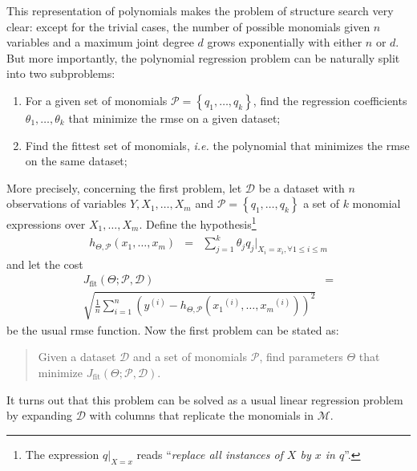 \documentclass[draft,authoryear,3p,times,twocolumn]{elsarticle}
\newcommand{\sample}[1]{\ensuremath{^{\left(#1\right)}}}
\begin{document}
This representation of polynomials makes the problem of structure search very clear: except for the trivial cases, the number of possible monomials given $n$ variables and a maximum joint degree $d$ grows exponentially with either $n$ or $d$. But more importantly, the polynomial regression problem can be naturally split into two subproblems:
%
\begin{enumerate}
\item For a given set of monomials $\mathcal{P} = \left\lbrace q_1, \ldots, q_k\right\rbrace$, find the regression coefficients $\theta_1,\ldots,\theta_k$ that minimize the \ac{rmse} on a given dataset;

\item Find the fittest set of monomials, \emph{i.e.} the polynomial that minimizes the \ac{rmse} on the same dataset;
\end{enumerate}
%
More precisely, concerning the first problem, let $\mathcal{D}$ be a dataset with $n$ observations of variables $Y, X_1,\ldots,X_m$ and $\mathcal{P} = \left\lbrace q_1,\ldots, q_k\right\rbrace$ a set of $k$ monomial expressions over $X_1,\ldots,X_m$. Define the hypothesis\footnote{The expression $q|_{X=x}$ reads ``\emph{replace all instances of $X$ by $x$ in $q$}''.}
%
\begin{eqnarray*}
h_{\Theta,\mathcal{P}}\left(x_1,\ldots,x_m\right) &=& \sum_{j = 1}^k \theta_j q_j|_{X_i=x_i,\forall 1 \leq i \leq m}
\end{eqnarray*}
%
and let the cost
%
\begin{eqnarray}
J_{\textrm{fit}}\left(\Theta;\mathcal{P},\mathcal{D}\right)  & =  \nonumber \\
\sqrt{\frac{1}{n}\sum_{i=1}^n \left( y\sample{i} - h_{\Theta,\mathcal{P}}\left( x_1\sample{i},\ldots,x_m\sample{i} \right) \right)^2 }\label{eq:rmse}
\end{eqnarray}
%
be the usual \acf{rmse} function. Now the first problem can be stated as:
%
\begin{quote}
Given a dataset $\mathcal{D}$ and a set of monomials $\mathcal{P}$, find parameters $\Theta$ that minimize $J_{\textrm{fit}}\left(\Theta;\mathcal{P},\mathcal{D}\right)$.
\end{quote}
%
It turns out that this problem can be solved as a usual linear regression problem by expanding $\mathcal{D}$ with columns that replicate the monomials in $\mathcal{M}$.
\end{document}
